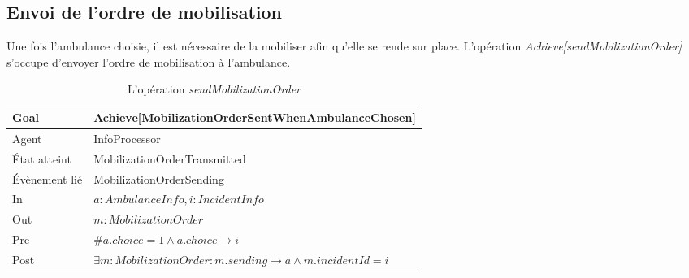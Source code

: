 \newpage
\subsection{Envoi de l'ordre de mobilisation}

	Une fois l'ambulance choisie, il est nécessaire de la mobiliser afin 
	qu'elle se rende sur place. L'opération \textit{Achieve[sendMobilizationOrder]}
	s'occupe d'envoyer l'ordre de mobilisation à l'ambulance.
	
	
	\begin{table}[!h] \centering
		\begin{tabularx}{\textwidth}{|l|X|} \hline
			Goal & Achieve[MobilizationOrderSentWhen\-AmbulanceChosen] \\ \hline
			Agent & InfoProcessor \\ \hline
			État atteint & MobilizationOrderTransmitted \\ \hline
			Évènement lié & MobilizationOrderSending \\ \hline
			In & $a: AmbulanceInfo, i: IncidentInfo$ \\ \hline
			Out & $m: MobilizationOrder$ \\ \hline
			Pre & $\#a.choice = 1 \wedge a.choice \rightarrow i$ \\ \hline
			Post & $\exists m: MobilizationOrder : m.sending \rightarrow  a \wedge m.incidentId = i$ \\ \hline 
		\end{tabularx}
		\caption{L'opération \textit{sendMobilizationOrder}}\label{tab:op4}
	\end{table}
